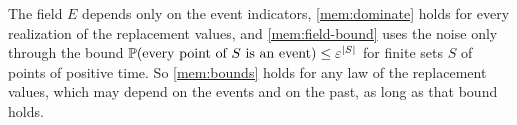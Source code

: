 \begin{remark}\label{mem:laws}
The field $E$ depends only on the event indicators, \cref{mem:dominate} holds for every realization of the replacement values, and \cref{mem:field-bound} uses the noise only through the bound $\mathbb{P}(\text{every point of }S\text{ is an event})\le\varepsilon^{|S|}$ for finite sets $S$ of points of positive time. So \eqref{mem:bounds} holds for any law of the replacement values, which may depend on the events and on the past, as long as that bound holds.
\end{remark}

